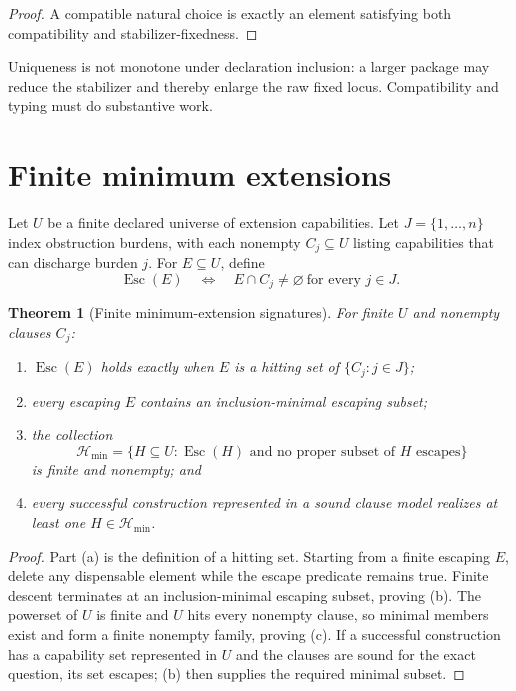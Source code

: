 \documentclass[11pt]{article}
\newtheorem{theorem}{Theorem}
\theoremstyle{definition}
\begin{document}
\begin{proof}
A compatible natural choice is exactly an element satisfying both
compatibility and stabilizer-fixedness.
\end{proof}

Uniqueness is not monotone under declaration inclusion: a larger package may
reduce the stabilizer and thereby enlarge the raw fixed locus.  Compatibility
and typing must do substantive work.

\section{Finite minimum extensions}

Let \(U\) be a finite declared universe of extension capabilities.  Let
\(J=\{1,\dots,n\}\) index obstruction burdens, with each nonempty
\(C_j\subseteq U\) listing capabilities that can discharge burden \(j\).
For \(E\subseteq U\), define
\[
  \operatorname{Esc}(E)
  \quad\Longleftrightarrow\quad
  E\cap C_j\ne\varnothing\ \text{for every }j\in J.
\]

\begin{theorem}[Finite minimum-extension signatures]
\label{thm:hitting}
For finite \(U\) and nonempty clauses \(C_j\):
\begin{enumerate}[label=(\alph*)]
  \item \(\operatorname{Esc}(E)\) holds exactly when \(E\) is a hitting set
        of \(\{C_j:j\in J\}\);
  \item every escaping \(E\) contains an inclusion-minimal escaping subset;
  \item the collection
        \[
          \mathcal H_{\min}
          =\{H\subseteq U:\operatorname{Esc}(H)
          \text{ and no proper subset of }H\text{ escapes}\}
        \]
        is finite and nonempty; and
  \item every successful construction represented in a sound clause model
        realizes at least one \(H\in\mathcal H_{\min}\).
\end{enumerate}
\end{theorem}

\begin{proof}
Part (a) is the definition of a hitting set.  Starting from a finite escaping
\(E\), delete any dispensable element while the escape predicate remains
true.  Finite descent terminates at an inclusion-minimal escaping subset,
proving (b).  The powerset of \(U\) is finite and \(U\) hits every nonempty
clause, so minimal members exist and form a finite nonempty family, proving
(c).  If a successful construction has a capability set represented in
\(U\) and the clauses are sound for the exact question, its set escapes; (b)
then supplies the required minimal subset.
\end{proof}
\end{document}
